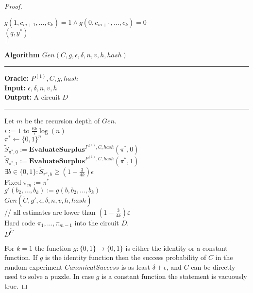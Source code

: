 \begin{proof}
\begin{codeblock}
  \IndI \If $g(1,c_{m+1}, \dots, c_k) =1 \land g(0,c_{m+1}, \dots, c_k) = 0$ \then \\
  \IndII \return $(q, y^*)$ \\
  \return $\bot$
%
\end{codeblock}
%
\begin{codeblock}
  \textbf{Algorithm $Gen(C, g, \epsilon, \delta, n, v, h, hash)$}
  \medskip
  \hrule
  \medskip
  \textbf{Oracle:} $ P^{(1)}, C, g, hash$ \\
  \textbf{Input:}  $\epsilon, \delta, n, v, h$\\
  \textbf{Output:} A circuit $D$
  \medskip\hrule\medskip
  Let $m$ be the recursion depth of $Gen$.\\
  \For $i:=1$ to $\frac{6k}{\epsilon}\log(n)$ \\
  \IndI $\pi^* \leftarrow \{0,1\}^{n}$\\
  \IndI $\widetilde{S}_{\pi^*,0} := \textbf{EvaluateSurplus}^{P^{(1)}, C, hash}(\pi^*, 0)$\\
  \IndI $\widetilde{S}_{\pi^*,1} := \textbf{EvaluateSurplus}^{P^{(1)}, C, hash}(\pi^*, 1)$\\
  \IndI \If $ \exists b \in \{0,1\}: \widetilde{S}_{\pi^*,b} \geq (1 - \frac{3}{4k}) \epsilon$ \\
  \IndII Fixed $\pi_m := \pi^*$ \\
  \IndII $g'(b_2, \dots, b_k) := g(b, b_2, \dots, b_k)$\\
  \IndII\return $Gen(\widetilde{C}, g', \epsilon, \delta, n, v, h, hash)$ \\

  // all estimates are lower than $(1-\frac{3}{4k})\varepsilon$\\
  Hard code $\pi_1, \dots, \pi_{m-1}$ into the circuit $D$. \\
  \return $D^{\widetilde{C}}$
\end{codeblock}
%
%
For $k=1$ the function $g: \{0,1\} \rightarrow \{0,1\}$ is either the identity or a constant function.
If $g$ is the identity function then the success probability of $C$ in the random experiment $CanonicalSuccess$ is as least $\delta + \epsilon$,
and $C$ can be directly used to solve a puzzle. In case $g$ is a constant function the statement is vacuously true.


\end{proof}

